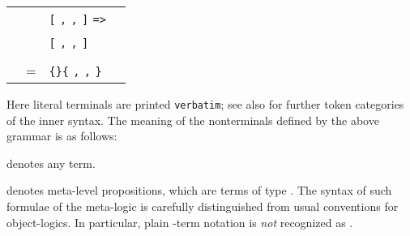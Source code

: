 \begin{isabellebody}
\begin{isamarkuptext}
\begin{center}
\begin{supertabular}{rclr}
    & \isa{{\isachardoublequote}{\isacharbar}{\isachardoublequote}} & \verb|[|  \verb|,| \isa{{\isachardoublequote}{\isasymdots}{\isachardoublequote}} \verb|,|  \verb|]| \verb|=>|  &  \\
    & \isa{{\isachardoublequote}{\isacharbar}{\isachardoublequote}} & \verb|[|  \verb|,| \isa{{\isachardoublequote}{\isasymdots}{\isachardoublequote}} \verb|,|  \verb|]| \isa{{\isachardoublequote}{\isasymRightarrow}{\isachardoublequote}}  &  \\\\

  \hypertarget{syntax.inner.sort}{\hyperlink{syntax.inner.sort}{\mbox{}}} & = & \verb|{}|\isa{{\isachardoublequote}\ \ {\isacharbar}\ \ {\isachardoublequote}}\verb|{|  \verb|,| \isa{{\isachardoublequote}{\isasymdots}{\isachardoublequote}} \verb|,|  \verb|}| \\
  \end{supertabular}
  \end{center}

  \medskip Here literal terminals are printed \verb|verbatim|;
  see also  for further token categories of the
  inner syntax.  The meaning of the nonterminals defined by the above
  grammar is as follows:

  \begin{description}

  \item {}\hyperlink{syntax.inner.any}{\mbox{}} denotes any term.

  \item {}\hyperlink{syntax.inner.prop}{\mbox{}} denotes meta-level propositions,
  which are terms of type .  The syntax of such formulae of
  the meta-logic is carefully distinguished from usual conventions for
  object-logics.  In particular, plain \isa{{\isachardoublequote}{\isasymlambda}{\isachardoublequote}}-term notation is
  \emph{not} recognized as \hyperlink{syntax.inner.prop}{\mbox{}}.


\end{description}
\end{isamarkuptext}
\end{isabellebody}
